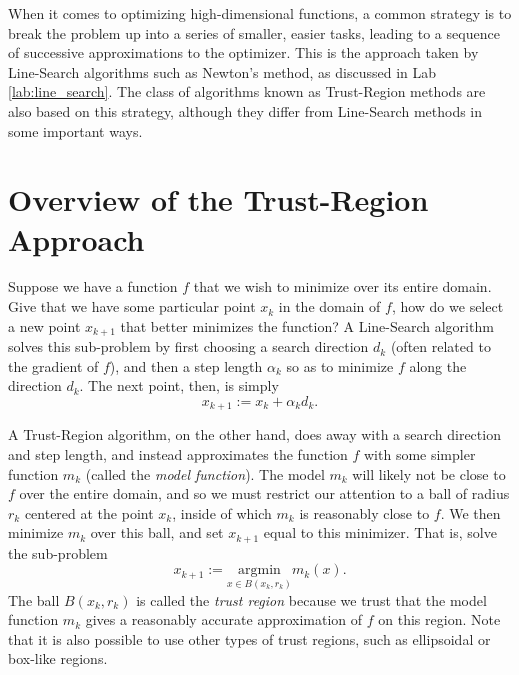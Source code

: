 \label{lab:trust_region}


When it comes to optimizing high-dimensional functions, a common strategy is to break
the problem up into a series of smaller, easier tasks, leading to a sequence of
successive approximations to the optimizer. This is the approach taken by Line-Search
algorithms such as Newton's method, as discussed in Lab \ref{lab:line_search}.
The class of algorithms known as Trust-Region methods are also based on this
strategy, although they differ from Line-Search methods in some important ways.

\section*{Overview of the Trust-Region Approach}
Suppose we have a function $f$ that we wish to minimize over its entire domain.
Give that we have some particular point $x_k$ in the domain of $f$, how do we
select a new point $x_{k+1}$ that better minimizes the function? A Line-Search
algorithm solves this sub-problem by first choosing a search direction $d_k$ 
(often related to the gradient of $f$), and then a step length $\alpha_k$ so
as to minimize $f$ along the direction $d_k$. The next point, then, is simply
\[
x_{k+1} := x_k + \alpha_k d_k.
\]

A Trust-Region algorithm, on the other hand, does away with a search direction and 
step length, and instead approximates the function $f$ with some simpler function
$m_k$ (called the \emph{model function}). The model $m_k$ will likely not be close to $f$ over the entire
domain, and so we must restrict our attention to a ball of radius $r_k$ centered at
the point $x_k$, inside of which $m_k$ is reasonably close to $f$. We then minimize
$m_k$ over this ball, and set $x_{k+1}$ equal to this minimizer. That is, solve the sub-problem
\[
x_{k+1} := \underset{x \in B(x_k, r_k)}{\text{argmin}} m_k(x).
\]
The ball $B(x_k, r_k)$ is called the \emph{trust region} because we trust that the
model function $m_k$ gives a reasonably accurate approximation of $f$ on this region.
Note that it is also possible to use other types of trust regions, such as 
ellipsoidal or box-like regions. 

